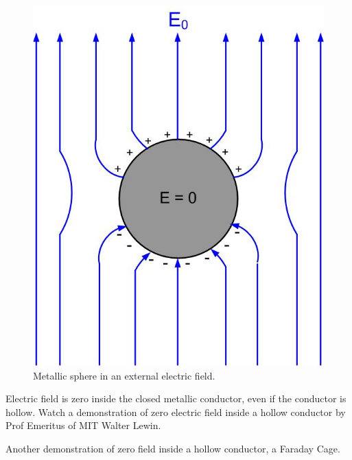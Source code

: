 \documentclass{ximera}
\begin{document}
\begin{figure}[!ht]
\begin{center}
\includegraphics[scale=0.5]{../jpg/metalsphereinefield.jpg}
\end{center}
\caption{Metallic sphere in an external electric field.}
\label{fig:BoundaryConditionMetal}
\end{figure}



Electric field is zero inside the closed metallic conductor, even if the conductor is hollow. Watch a demonstration of zero electric field inside a hollow conductor by Prof Emeritus of MIT Walter Lewin. 


\begin{center}  
\end{center} 

Another demonstration of zero field inside a hollow conductor, a Faraday Cage.


\begin{center}  
\end{center}
\end{document}
